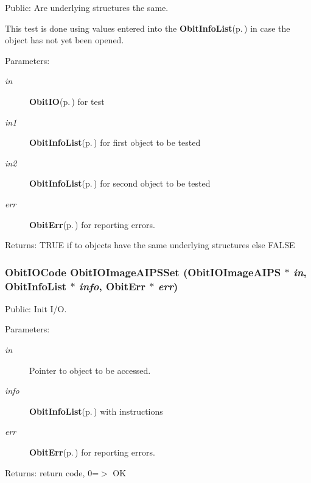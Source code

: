 Public: Are underlying structures the same. 

This test is done using values entered into the {\bf Obit\-Info\-List}{\rm (p.\,\pageref{structObitInfoList})} in case the object has not yet been opened. \begin{Desc}
\item[Parameters:]
\begin{description}
\item[{\em in}]{\bf Obit\-IO}{\rm (p.\,\pageref{structObitIO})} for test \item[{\em in1}]{\bf Obit\-Info\-List}{\rm (p.\,\pageref{structObitInfoList})} for first object to be tested \item[{\em in2}]{\bf Obit\-Info\-List}{\rm (p.\,\pageref{structObitInfoList})} for second object to be tested \item[{\em err}]{\bf Obit\-Err}{\rm (p.\,\pageref{structObitErr})} for reporting errors. \end{description}
\end{Desc}
\begin{Desc}
\item[Returns:]TRUE if to objects have the same underlying structures else FALSE \end{Desc}
\subsubsection{\setlength{\rightskip}{0pt plus 5cm}Obit\-IOCode Obit\-IOImage\-AIPSSet ({\bf Obit\-IOImage\-AIPS} $\ast$ {\em in}, {\bf Obit\-Info\-List} $\ast$ {\em info}, {\bf Obit\-Err} $\ast$ {\em err})}\label{ObitIOImageAIPS_8h_a12}


Public: Init I/O. 

\begin{Desc}
\item[Parameters:]
\begin{description}
\item[{\em in}]Pointer to object to be accessed. \item[{\em info}]{\bf Obit\-Info\-List}{\rm (p.\,\pageref{structObitInfoList})} with instructions \item[{\em err}]{\bf Obit\-Err}{\rm (p.\,\pageref{structObitErr})} for reporting errors. \end{description}
\end{Desc}
\begin{Desc}
\item[Returns:]return code, 0=$>$ OK \end{Desc}
